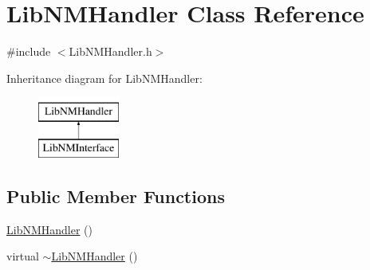 \hypertarget{classLibNMHandler}{}\section{Lib\+N\+M\+Handler Class Reference}
\label{classLibNMHandler}


{\ttfamily \#include $<$Lib\+N\+M\+Handler.\+h$>$}

Inheritance diagram for Lib\+N\+M\+Handler\+:\begin{figure}[H]
\begin{center}
\leavevmode
\includegraphics[height=2.000000cm]{classLibNMHandler}
\end{center}
\end{figure}
\subsection*{Public Member Functions}
\begin{DoxyCompactItemize}
\item 
\mbox{\hyperlink{classLibNMHandler_a26c785ea6775c3a7294eb7d10a450864}{Lib\+N\+M\+Handler}} ()
\item 
virtual \mbox{\hyperlink{classLibNMHandler_a88cedcde563ac8cce44c0cf50f86f042}{$\sim$\+Lib\+N\+M\+Handler}} ()
\end{DoxyCompactItemize}
